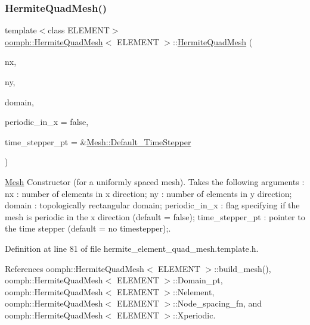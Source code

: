 \subsubsection{\texorpdfstring{Hermite\+Quad\+Mesh()}{HermiteQuadMesh()}\hspace{0.1cm}{\footnotesize\ttfamily [1/2]}}
{\footnotesize\ttfamily template$<$class E\+L\+E\+M\+E\+NT$>$ \\
\hyperlink{classoomph_1_1HermiteQuadMesh}{oomph\+::\+Hermite\+Quad\+Mesh}$<$ E\+L\+E\+M\+E\+NT $>$\+::\hyperlink{classoomph_1_1HermiteQuadMesh}{Hermite\+Quad\+Mesh} (\begin{DoxyParamCaption}\item[{const unsigned \&}]{nx,  }\item[{const unsigned \&}]{ny,  }\item[{\hyperlink{classoomph_1_1TopologicallyRectangularDomain}{Topologically\+Rectangular\+Domain} $\ast$}]{domain,  }\item[{const bool \&}]{periodic\+\_\+in\+\_\+x = {\ttfamily false},  }\item[{\hyperlink{classoomph_1_1TimeStepper}{Time\+Stepper} $\ast$}]{time\+\_\+stepper\+\_\+pt = {\ttfamily \&\hyperlink{classoomph_1_1Mesh_a12243d0fee2b1fcee729ee5a4777ea10}{Mesh\+::\+Default\+\_\+\+Time\+Stepper}} }\end{DoxyParamCaption})\hspace{0.3cm}{\ttfamily [inline]}}



\hyperlink{classoomph_1_1Mesh}{Mesh} Constructor (for a uniformly spaced mesh). Takes the following arguments \+: nx \+: number of elements in x direction; ny \+: number of elements in y direction; domain \+: topologically rectangular domain; periodic\+\_\+in\+\_\+x \+: flag specifying if the mesh is periodic in the x direction (default = false); time\+\_\+stepper\+\_\+pt \+: pointer to the time stepper (default = no timestepper);. 



Definition at line 81 of file hermite\+\_\+element\+\_\+quad\+\_\+mesh.\+template.\+h.



References oomph\+::\+Hermite\+Quad\+Mesh$<$ E\+L\+E\+M\+E\+N\+T $>$\+::build\+\_\+mesh(), oomph\+::\+Hermite\+Quad\+Mesh$<$ E\+L\+E\+M\+E\+N\+T $>$\+::\+Domain\+\_\+pt, oomph\+::\+Hermite\+Quad\+Mesh$<$ E\+L\+E\+M\+E\+N\+T $>$\+::\+Nelement, oomph\+::\+Hermite\+Quad\+Mesh$<$ E\+L\+E\+M\+E\+N\+T $>$\+::\+Node\+\_\+spacing\+\_\+fn, and oomph\+::\+Hermite\+Quad\+Mesh$<$ E\+L\+E\+M\+E\+N\+T $>$\+::\+Xperiodic.

